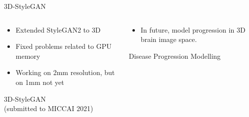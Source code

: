\documentclass[8pt,xcolor=table,aspectratio=169]{beamer}
\begin{document}
\begin{frame}{3D-StyleGAN}



\begin{columns}
\begin{column}[t]{0.5\textwidth}
\begin{itemize}
 \item Extended StyleGAN2 to 3D
 \item Fixed problems related to GPU memory 
 \item Working on 2mm resolution, but on 1mm not yet
\end{itemize}

\centering
{} 3D-StyleGAN
 \\
(submitted to MICCAI 2021)
\end{column}
\begin{column}[t]{0.5\textwidth}

\begin{itemize}
 \item In future, model progression in 3D brain image space.   
\end{itemize}
\vt

\centering
{} Disease Progression Modelling
 
\end{column}
\end{columns}


\begin{center}

\end{center}

\end{frame}
\end{document}

